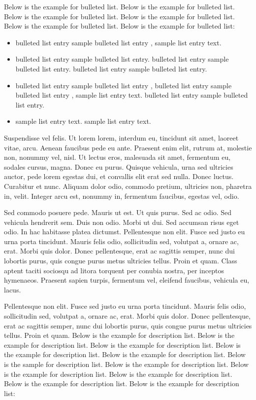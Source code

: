 \documentclass[ASNA,twocolumn]{USG} %
\begin{document}
{Below is the example \cite{Caramana1998,Mavriplis2003,Hoch2009} for bulleted list. Below is the example for bulleted list. Below is the example for bulleted list. Below is the example for bulleted list. Below is the example for bulleted list. Below is the example for bulleted list:
\begin{itemize}
\item bulleted list entry sample bulleted list entry \cite{Scovazzi2008}, sample list entry text.
\item bulleted list entry sample bulleted list entry. bulleted list entry sample bulleted list entry. bulleted list entry sample bulleted list entry.
\item bulleted list entry sample bulleted list entry \cite{Shashkov1996}, bulleted list entry sample bulleted list entry \cite{Knupp1999}, sample list entry text.  bulleted list entry sample bulleted list entry.
\item sample list entry text. sample list entry text.
\end{itemize}

Suspendisse vel felis. Ut lorem lorem, interdum eu, tincidunt sit amet, laoreet vitae, arcu. Aenean faucibus pede eu
ante. Praesent enim elit, rutrum at, molestie non, nonummy vel, nisl. Ut lectus eros, malesuada sit amet, fermentum
eu, sodales cursus, magna. Donec eu purus. Quisque vehicula, urna sed ultricies auctor, pede lorem egestas dui, et
convallis elit erat sed nulla. Donec luctus. Curabitur et nunc. Aliquam dolor odio, commodo pretium, ultricies non,
pharetra in, velit. Integer arcu est, nonummy in, fermentum faucibus, egestas vel, odio.

Sed commodo posuere pede. Mauris ut est. Ut quis purus. Sed ac odio. Sed vehicula hendrerit sem. Duis non
odio. Morbi ut dui. Sed accumsan risus eget odio. In hac habitasse platea dictumst. Pellentesque non elit. Fusce
sed justo eu urna porta tincidunt. Mauris felis odio, sollicitudin sed, volutpat a, ornare ac, erat. Morbi quis dolor. Donec pellentesque, erat ac sagittis semper, nunc dui lobortis purus, quis congue purus metus ultricies tellus. Proin
et quam. Class aptent taciti sociosqu ad litora torquent per conubia nostra, per inceptos hymenaeos. Praesent sapien
turpis, fermentum vel, eleifend faucibus, vehicula eu, lacus.

Pellentesque non elit. Fusce
sed justo eu urna porta tincidunt. Mauris felis odio, sollicitudin sed, volutpat a, ornare ac, erat. Morbi quis dolor. Donec pellentesque, erat ac sagittis semper, nunc dui lobortis purus, quis congue purus metus ultricies tellus. Proin
et quam. Below is the example for description list. Below is the example for description list. Below is the example for description list. Below is the example for description list. Below is the example for description list. Below is the sample for description list. Below is the example for description list. Below is the example for description list. Below is the example for description list. Below is the example for description list. Below is the example for description list:\medskip

}
\end{document}
